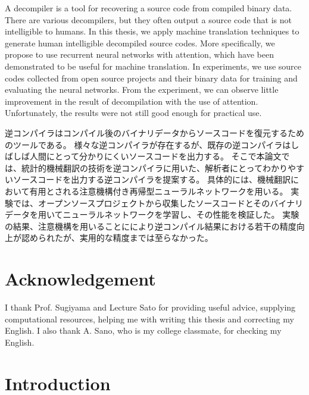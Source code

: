 \documentclass[senior,final,11pt]{iscs-thesis}
\date{February 1, 2018}
\begin{document}
\begin{eabstract}
A decompiler is a tool for recovering a source code from compiled binary data.
There are various decompilers, but they often output a source code that is not intelligible to humans. 
In this thesis, we apply machine translation techniques to generate human intelligible decompiled source codes. 
More specifically, we propose to use recurrent neural networks with attention, 
which have been demonstrated to be useful for machine translation. 
In experiments, we use source codes collected from open source projects and their binary data for training and evaluating the neural networks.
From the experiment, we can observe little improvement in the result of decompilation with the use of attention.
Unfortunately, the results were not still good enough for practical use.

\end{eabstract}
\begin{jabstract}
逆コンパイラはコンパイル後のバイナリデータからソースコードを復元するためのツールである。
様々な逆コンパイラが存在するが、既存の逆コンパイラはしばしば人間にとって分かりにくいソースコードを出力する。
そこで本論文では、統計的機械翻訳の技術を逆コンパイラに用いた、解析者にとってわかりやすいソースコードを出力する逆コンパイラを提案する。
具体的には、機械翻訳において有用とされる注意機構付き再帰型ニューラルネットワークを用いる。
実験では、オープンソースプロジェクトから収集したソースコードとそのバイナリデータを用いてニューラルネットワークを学習し、その性能を検証した。
実験の結果、注意機構を用いることににより逆コンパイル結果における若干の精度向上が認められたが、実用的な精度までは至らなかった。
\end{jabstract}



\maketitle

\chapter*{Acknowledgement}
I thank Prof. Sugiyama and Lecture Sato for providing useful advice, supplying computational resources, helping me with writing this thesis and 
correcting my English.
I also thank A. Sano, who is my college classmate, for checking my English.

\tableofcontents

\chapter{Introduction}
\end{document}
